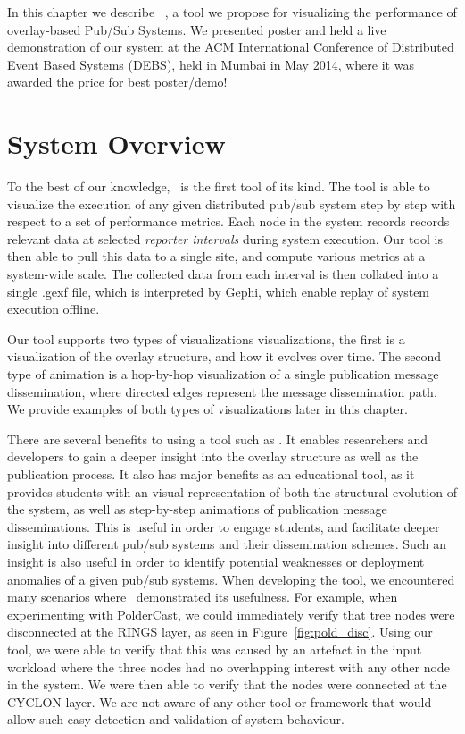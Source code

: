 In this chapter we describe \demo~\cite{korsveien2014vizpub}, a tool we
propose for visualizing the performance of overlay-based Pub/Sub
Systems. We presented poster and held a live demonstration of our system
at the ACM International Conference of Distributed Event Based Systems
(DEBS), held in Mumbai in May 2014, where it was awarded the price for
best poster/demo!

\section{System Overview}
\label{sec:overview}

To the best of our knowledge, \demo~is the first tool of its kind. The
tool is able to visualize the execution of any given distributed pub/sub
system step by step with respect to a set of performance metrics. Each
node in the system records records relevant data at selected
\emph{reporter intervals} during system execution. Our tool is then able to pull this data to a
single site, and compute various metrics at a system-wide scale. The
collected data from each interval is then collated into a single
.gexf file, which is interpreted by Gephi, which enable replay of system
execution offline.

Our tool supports two types of visualizations visualizations, the first is a
visualization of the overlay structure, and how it evolves over time.
The second type of animation is a hop-by-hop visualization of a single
publication message dissemination, where directed edges represent the
message dissemination path. We provide examples of both types of
visualizations later in this chapter.

There are several benefits to using a tool such as \demo. It enables
researchers and developers to gain a deeper insight into the overlay
structure as well as the publication process. It also has major benefits
as an educational tool, as it provides students with an visual
representation of both the structural evolution of the system, as well
as step-by-step animations of publication message disseminations. This
is useful in order to engage students, and facilitate deeper insight
into different pub/sub systems and their dissemination schemes. Such an
insight is also useful in order to identify potential weaknesses or
deployment anomalies of a given pub/sub systems. When developing the
tool, we encountered many scenarios where \demo~demonstrated its
usefulness. For example, when experimenting with PolderCast, we could
immediately verify that tree nodes were disconnected at the RINGS layer,
as seen in Figure~\ref{fig:pold_disc}.  Using our tool, we were able to
verify that this was caused by an artefact in the input workload where
the three nodes had no overlapping interest with any other node in the
system. We were then able to verify that the nodes were connected at the
CYCLON layer. We are not aware of any other tool or framework that would
allow such easy detection and validation of system behaviour.

